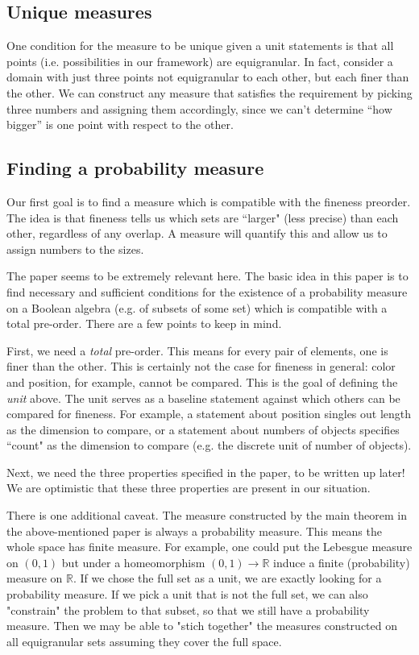 \documentclass[11pt]{article}
\begin{document}
\subsection{Unique measures}

One condition for the measure to be unique given a unit statements is that all points (i.e. possibilities in our framework) are equigranular. In fact, consider a domain with just three points not equigranular to each other, but each finer than the other. We can construct any measure that satisfies the requirement by picking three numbers and assigning them accordingly, since we can't determine ``how bigger'' is one point with respect to the other.

\subsection{Finding a probability measure}

Our first goal is to find a measure which is compatible with the fineness preorder. The idea is that fineness tells us which sets are ``larger" (less precise) than each other, regardless of any overlap.  A measure will quantify this and allow us to assign numbers to the sizes.

The paper \cite{probexistence} seems to be extremely relevant here. The basic idea in this paper is to find necessary and sufficient conditions for the existence of a probability measure on a Boolean algebra (e.g. of subsets of some set) which is compatible with a total pre-order. There are a few points to keep in mind. 

First, we need a \emph{total} pre-order. This means for every pair of elements, one is finer than the other. This is certainly not the case for fineness in general: color and position, for example, cannot be compared. This is the goal of defining the \emph{unit} above. The unit serves as a baseline statement against which others can be compared for fineness. For example, a statement about position singles out length as the dimension to compare, or a statement about numbers of objects specifies ``count" as the dimension to compare (e.g. the discrete unit of number of objects). 

Next, we need the three properties specified in the paper, to be written up later! We are optimistic that these three properties are present in our situation. 

There is one additional caveat. The measure constructed by the main theorem in the above-mentioned paper is always a probability measure. This means the whole space has finite measure. For example, one could put the Lebesgue measure on $(0,1)$ but under a homeomorphism $(0,1)\to\mathbb{R}$ induce a finite (probability) measure on  $\mathbb{R}$. If we chose the full set as a unit, we are exactly looking for a probability measure. If we pick a unit that is not the full set, we can also "constrain" the problem to that subset, so that we still have a probability measure. Then we may be able to "stich together" the measures constructed on all equigranular sets assuming they cover the full space. 
\end{document}
